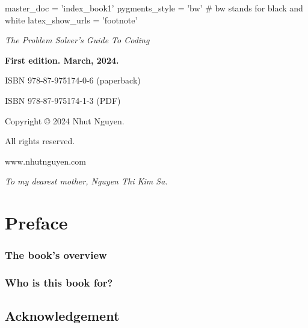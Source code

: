 master_doc = 'index_book1'
pygments_style = 'bw' # bw stands for black and white
latex_show_urls = 'footnote'


\usepackage[paperwidth=17cm,paperheight=22cm]{geometry}

\date{March, 2024}
% 
\frontmatter


\textit{The Problem Solver's Guide To Coding} 

\textbf{First edition. March, 2024.} 

ISBN 978-87-975174-0-6 (paperback)

ISBN 978-87-975174-1-3 (PDF)


Copyright © 2024 Nhut Nguyen.

All rights reserved.

www.nhutnguyen.com

\newpage
\begin{center}
    \textit{To my dearest mother, Nguyen Thi Kim Sa.}
\end{center}

\sphinxstepscope



\chapter*{Preface}

\subsection*{The book’s overview}

\subsection*{Who is this book for?}

\section*{Acknowledgement}

\newpage




